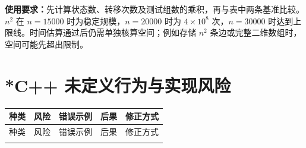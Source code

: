 \documentclass[a4paper,11pt]{article}
\begin{document}
\endgroup

{\small\textbf{使用要求：}先计算状态数、转移次数及测试组数的乘积，再与表中两条基准比较。$n^2$ 在 $n=15000$ 时为稳定规模，$n=20000$ 时为 $4\times10^8$ 次，$n=30000$ 时达到上限线。时间估算通过后仍需单独核算空间；例如存储 $n^2$ 条边或完整二维数组时，空间可能先超出限制。}

\newpage
\section{*C++ 未定义行为与实现风险}

\begingroup
\small
\begin{longtable}{L{1.1cm} L{2.5cm} L{4.3cm} L{2.8cm} L{4.8cm}}
\toprule
种类 & 风险 & 错误示例 & 后果 & 修正方式 \\
\midrule
\endfirsthead
\toprule
种类 & 风险 & 错误示例 & 后果 & 修正方式 \\
\midrule
\endhead
\endfoot
\bottomrule
\endlastfoot


\end{longtable}
\end{document}
